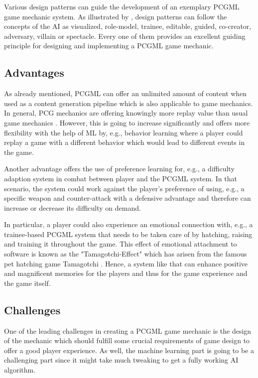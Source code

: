 \documentclass[MGS,Master,english]{twbook}%
\begin{document}
Various design patterns can guide the development of an exemplary PCGML game mechanic system. As illustrated by \citep{ai::aiBasedGameDesignPattern}, design patterns can follow the concepts of the \ac{AI} as visualized, role-model, trainee, editable, guided, co-creator, adversary, villain or spectacle. Every one of them provides an excellent guiding principle for designing and implementing a PCGML game mechanic.

\subsection{Advantages}
As already mentioned, PCGML can offer an unlimited amount of content when used as a content generation pipeline which is also applicable to game mechanics. In general, PCG mechanics are offering knowingly more replay value than usual game mechanics \cite{pcg::book}. However, this is going to increase significantly and offers more flexibility with the help of ML by, e.g., behavior learning where a player could replay a game with a different behavior which would lead to different events in the game.

Another advantage offers the use of preference learning for, e.g., a difficulty adaption system in combat between player and the PCGML system. In that scenario, the system could work against the player’s preference of using, e.g., a specific weapon and counter-attack with a defensive advantage and therefore can increase or decrease its difficulty on demand.

In particular, a player could also experience an emotional connection with, e.g., a trainee-based PCGML system that needs to be taken care of by hatching, raising and training it throughout the game. This effect of emotional attachment to software is known as the "Tamagotchi-Effect" which has arisen from the famous pet hatching game Tamagotchi \cite{intro::tamagotchiEffect}. Hence, a system like that can enhance positive and magnificent memories for the players and thus for the game experience and the game itself.

\subsection{Challenges}
One of the leading challenges in creating a PCGML game mechanic is the design of the mechanic which should fulfill some crucial requirements of game design to offer a good player experience. As well, the machine learning part is going to be a challenging part since it might take much tweaking to get a fully working AI algorithm.
\end{document}
